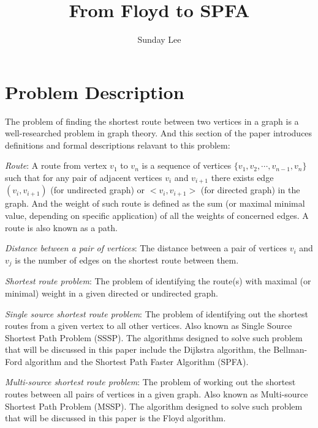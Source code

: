 \documentclass[a4paper,11pt,twocolumn]{article}
\title{From Floyd to SPFA}
\date{\vspace{-5ex}}
\author{Sunday Lee}
\begin{document}

\section{Problem Description}


The problem of finding the shortest route between two vertices in a graph is a well-researched problem in graph theory. And this section of the paper introduces definitions and formal descriptions relavant to this problem:

\emph{Route}: A route from vertex $v_1$ to $v_n$ is a sequence of vertices ${\{v_1,v_2,\cdots,v_{n-1},v_n}\}$ such that for any pair of adjacent vertices $v_i$ and $v_{i+1}$ there exists edge $(v_i,v_{i+1})$ (for undirected graph) or $<v_i,v_{i+1}>$ (for directed graph) in the graph. And the weight of such route is defined as the sum (or maximal \/ minimal value, depending on specific application) of all the weights of concerned edges. A route is also known as a path.

\emph{Distance between a pair of vertices}: The distance between a pair of vertices $v_i$ and $v_j$ is the number of edges on the shortest route between them.

\emph{Shortest route problem}: The problem of identifying the route(s) with maximal (or minimal) weight in a given directed or undirected graph.

\emph{Single source shortest route problem}: The problem of identifying out the shortest routes from a given vertex to all other vertices. Also known as Single Source Shortest Path Problem (SSSP). The algorithms designed to solve such problem that will be discussed in this paper include the Dijkstra algorithm, the Bellman-Ford algorithm and the Shortest Path Faster Algorithm (SPFA).

\emph{Multi-source shortest route problem}: The problem of working out the shortest routes between all pairs of vertices in a given graph. Also known as Multi-source Shortest Path Problem (MSSP). The algorithm designed to solve such problem that will be discussed in this paper is the Floyd algorithm.
\end{document}
